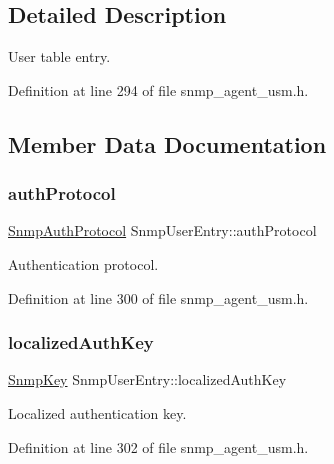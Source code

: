 \subsection{Detailed Description}
User table entry. 

Definition at line 294 of file snmp\+\_\+agent\+\_\+usm.\+h.



\subsection{Member Data Documentation}
\mbox{\label{structSnmpUserEntry_a5131eefca59001108b44e59b284397db}} 
\subsubsection{\texorpdfstring{auth\+Protocol}{authProtocol}}
{\footnotesize\ttfamily \hyperlink{snmp__agent__usm_8h_a13c46b84c881bd15bad7093a7f3639e3}{Snmp\+Auth\+Protocol} Snmp\+User\+Entry\+::auth\+Protocol}



Authentication protocol. 



Definition at line 300 of file snmp\+\_\+agent\+\_\+usm.\+h.

\mbox{\label{structSnmpUserEntry_abe989af09e827849ce740a3813edcbc7}} 
\subsubsection{\texorpdfstring{localized\+Auth\+Key}{localizedAuthKey}}
{\footnotesize\ttfamily \hyperlink{structSnmpKey}{Snmp\+Key} Snmp\+User\+Entry\+::localized\+Auth\+Key}



Localized authentication key. 



Definition at line 302 of file snmp\+\_\+agent\+\_\+usm.\+h.

\mbox{\label{structSnmpUserEntry_aee3ff1ac4b61b242440a14543c06bef2}} 
